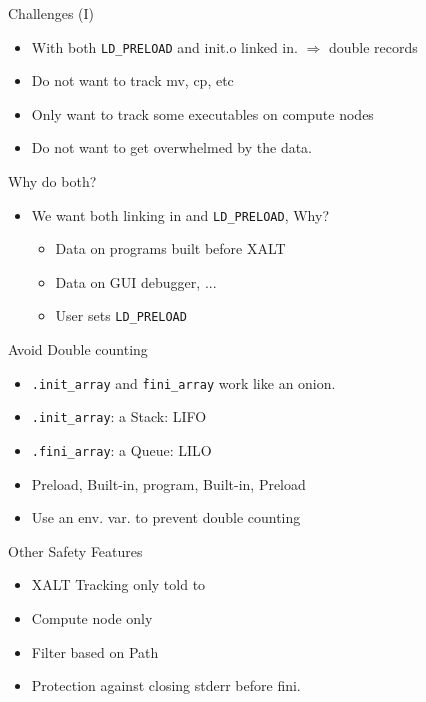 \documentclass{beamer}
\begin{document}
\begin{frame}{Challenges (I)}
  \begin{itemize}
    \item With both \texttt{LD\_PRELOAD} and init.o linked
      in. $\Rightarrow$ double records
    \item Do not want to track mv, cp, etc
    \item Only want to track some executables on compute nodes
    \item Do not want to get overwhelmed by the data. 
  \end{itemize}
\end{frame}

\begin{frame}{Why do both?}
  \begin{itemize}
    \item We want both linking in and \texttt{LD\_PRELOAD}, Why?
      \begin{itemize}
        \item Data on programs built before XALT
        \item Data on GUI debugger, ...
        \item User sets \texttt{LD\_PRELOAD}
      \end{itemize}
  \end{itemize}
\end{frame}

\begin{frame}{Avoid Double counting}
  \begin{itemize}
    \item \texttt{.init\_array} and \texttt{\.fini\_array} work like
      an onion.
    \item \texttt{.init\_array}: a Stack: LIFO
    \item \texttt{.fini\_array}: a Queue: LILO
    \item Preload, Built-in, program, Built-in, Preload
    \item Use an env. var. to prevent double counting
  \end{itemize}
\end{frame}

\begin{frame}{Other Safety Features}
  \begin{itemize}
    \item XALT Tracking only told to
    \item Compute node only
    \item Filter based on Path
    \item Protection against closing stderr before fini.
  \end{itemize}
\end{frame}
\end{document}
